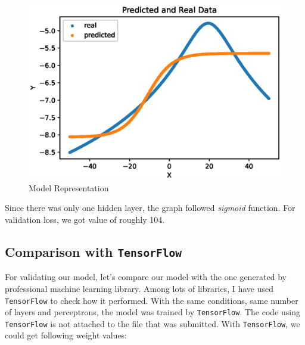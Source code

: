\documentclass{homework}
\begin{document}
\begin{figure}[h]
  \centering
  \includegraphics[scale=0.8]{single_layer.eps}
  \caption{Model Representation}
\end{figure}

Since there was only one hidden layer, the graph followed \textit{sigmoid} function. For validation loss, we got value of roughly 104.



\subsection{Comparison with \texttt{TensorFlow}}
For validating our model, let's compare our model with the one generated by professional machine learning library. Among lots of libraries, I have used \texttt{TensorFlow} to check how it performed. With the same conditions, same number of layers and perceptrons, the model was trained by \texttt{TensorFlow}. The code using \texttt{TensorFlow} is not attached to the file that was submitted. With \texttt{TensorFlow}, we could get following weight values:
\end{document}
